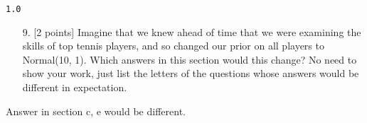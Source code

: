 \documentclass[12pt,a4paper]{article}
\begin{document}
\begin{lstlisting}
1.0
\end{lstlisting}


\begin{itemize}
\item[9.  ] [2 points] Imagine that we knew ahead of time that we were examining the skills of top tennis players, and so changed our prior on all players to Normal(10, 1). Which answers in this section would this change? No need to show your work, just list the letters of the questions whose answers would be different in expectation.

\end{itemize}
Answer in section c, e would be different.
\end{document}

